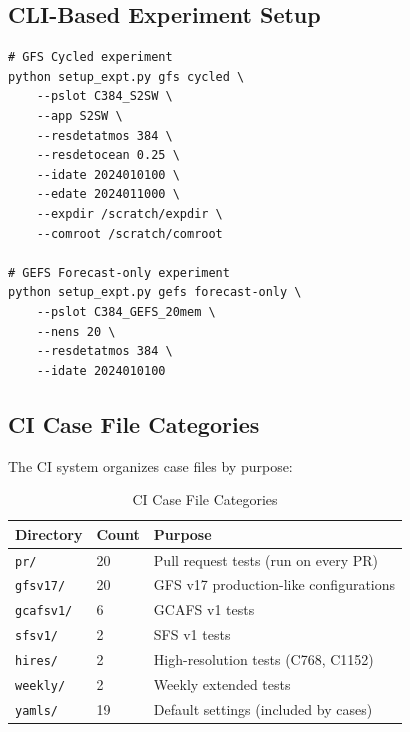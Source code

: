 \documentclass[11pt,letterpaper]{article}
\begin{document}
\subsection{CLI-Based Experiment Setup}

\begin{lstlisting}[style=bashstyle, title=CLI Experiment Setup]
# GFS Cycled experiment
python setup_expt.py gfs cycled \
    --pslot C384_S2SW \
    --app S2SW \
    --resdetatmos 384 \
    --resdetocean 0.25 \
    --idate 2024010100 \
    --edate 2024011000 \
    --expdir /scratch/expdir \
    --comroot /scratch/comroot

# GEFS Forecast-only experiment
python setup_expt.py gefs forecast-only \
    --pslot C384_GEFS_20mem \
    --nens 20 \
    --resdetatmos 384 \
    --idate 2024010100
\end{lstlisting}

\subsection{CI Case File Categories}

The CI system organizes case files by purpose:

\begin{table}[H]
\centering
\caption{CI Case File Categories}
\label{tab:ci-cases}
\begin{tabular}{@{}llp{5.5cm}@{}}
\toprule
\textbf{Directory} & \textbf{Count} & \textbf{Purpose} \\
\midrule
\texttt{pr/} & 20 & Pull request tests (run on every PR) \\
\texttt{gfsv17/} & 20 & GFS v17 production-like configurations \\
\texttt{gcafsv1/} & 6 & GCAFS v1 tests \\
\texttt{sfsv1/} & 2 & SFS v1 tests \\
\texttt{hires/} & 2 & High-resolution tests (C768, C1152) \\
\texttt{weekly/} & 2 & Weekly extended tests \\
\texttt{yamls/} & 19 & Default settings (included by cases) \\
\bottomrule
\end{tabular}
\end{table}

\end{document}
